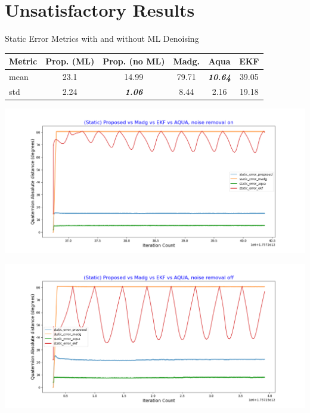 \documentclass[aspectratio=169,xcolor=dvipsnames]{beamer}
\begin{document}
\section{Unsatisfactory Results}

\begin{frame}{Static Error Metrics with and without ML Denoising}
\small
\begin{minipage}{\textwidth}
  \centering
  \scriptsize
  \label{tab:static_ml}
  \begin{tabular}{lccccc}
    \toprule
    Metric & Prop. (ML) & Prop. (no ML) & Madg. & Aqua & EKF \\
    \midrule
    mean  & 23.1  & 14.99 & 79.71 & \textit{\textbf{10.64}} & 39.05  \\
    std   & 2.24  & \textit{\textbf{1.06}} & 8.44 & 2.16 & 19.18  \\
    \bottomrule
  \end{tabular}
\end{minipage}

\vspace{0.5cm}

\begin{minipage}{0.5\textwidth}
  \centering
  \includegraphics[width=\linewidth]{graphs/static_ml.png}
\end{minipage}%
\hfill
\begin{minipage}{0.5\textwidth}
  \centering
  \includegraphics[width=\linewidth]{graphs/static_no_ml.png}
\end{minipage}

\end{frame}
\end{document}
